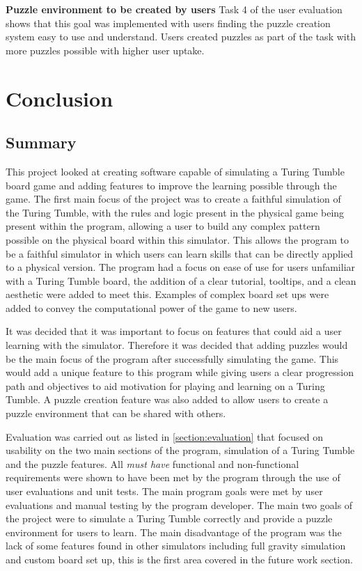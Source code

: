 \documentclass{l4proj}
\begin{document}
\textbf{Puzzle environment to be created by users} Task 4 of the user evaluation shows that this goal was implemented with users finding the puzzle creation system easy to use and understand. Users created puzzles as part of the task with more puzzles possible with higher user uptake. 





\chapter{Conclusion}
\section{Summary}
This project looked at creating software capable of simulating a Turing Tumble board game and adding features to improve the learning possible through the game. The first main focus of the project was to create a faithful simulation of the Turing Tumble, with the rules and logic present in the physical game being present within the program, allowing a user to build any complex pattern possible on the physical board within this simulator. This allows the program to be a faithful simulator in which users can learn skills that can be directly applied to a physical version. The program had a focus on ease of use for users unfamiliar with a Turing Tumble board, the addition of a clear tutorial, tooltips, and a clean aesthetic were added to meet this. Examples of complex board set ups were added to convey the computational power of the game to new users. 

It was decided that it was important to focus on features that could aid a user learning with the simulator. Therefore it was decided that adding puzzles would be the main focus of the program after successfully simulating the game. This would add a unique feature to this program while giving users a clear progression path and objectives to aid motivation for playing and learning on a Turing Tumble. A puzzle creation feature was also added to allow users to create a puzzle environment that can be shared with others. 

Evaluation was carried out as listed in \ref{section:evaluation} that focused on usability on the two main sections of the program, simulation of a Turing Tumble and the puzzle features. All \emph{must have} functional and non-functional requirements were shown to have been met by the program through the use of user evaluations and unit tests. The main program goals were met by user evaluations and manual testing by the program developer. The main two goals of the project were to simulate a Turing Tumble correctly and provide a puzzle environment for users to learn. The main disadvantage of the program was the lack of some features found in other simulators including full gravity simulation and custom board set up, this is the first area covered in the future work section.
\end{document}
